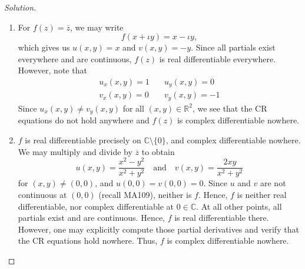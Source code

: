 \documentclass[11pt]{article}
\theoremstyle{definition}
\newenvironment{soln}{\begin{proof}[Solution]}{\end{proof}}
\begin{document}
\begin{enumerate}[leftmargin=*]
\begin{soln}
\begin{enumerate}
        \item For $f(z) = \overline{z}$, we may write
        \[
            f(x+\iota y) = x - \iota y,
        \]
        which gives us $u(x,y) = x$ and $v(x,y) = -y$. Since all partials exist everywhere and are continuous, $f(z)$ is real differentiable everywhere. However, note that
        \begin{align*}
            u_x(x,y) = 1 &\quad u_y(x,y) = 0 \\
            v_x(x,y) = 0 &\quad v_y(x,y) = -1
        \end{align*}
        Since $u_x(x,y) \neq v_y(x,y)$ for all $(x,y) \in \mathbb{R}^2$, we see that the CR equations do not hold anywhere and $f(z)$ is complex differentiable nowhere.
        
        \item $f$ is real differentiable precisely on $\mathbb{C} \setminus \{ 0\}$, and complex differentiable nowhere. We may multiply and divide by $\overline{z}$ to obtain
        \[
            u(x,y) = \frac{x^2-y^2}{x^2+y^2} \quad \text{and} \quad v(x,y) = \frac{2xy}{x^2+y^2}
        \]
        for $(x,y) \neq (0,0)$, and $u(0,0) = v(0,0) = 0$. Since $u$ and $v$ are not continuous at $(0,0)$ (recall MA109), neither is $f$. Hence, $f$ is neither real differentiable, nor complex differentiable at $0 \in \mathbb{C}$. At all other points, all partials exist and are continuous. Hence, $f$ is real differentiable there. However, one may explicitly compute those partial derivatives and verify that the CR equations hold nowhere. Thus, $f$ is complex differentiable nowhere. \qedhere
        
    \end{enumerate} 
\end{soln}
\end{enumerate}

\newpage
\end{document}
